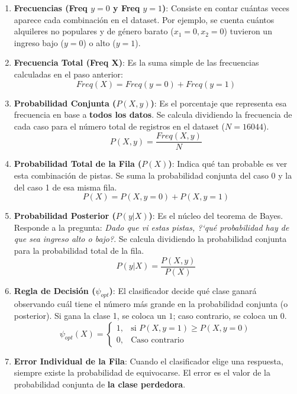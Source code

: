 \documentclass[12pt,a4paper]{article}
\begin{document}
\begin{enumerate}[label=\arabic*.]
  \item \textbf{Frecuencias (Freq $y=0$ y Freq $y=1$)}: 
  Consiste en contar cu\'antas veces aparece cada combinaci\'on en el dataset. Por ejemplo, se cuenta cu\'antos alquileres no populares y de g\'enero barato ($x_1=0, x_2=0$) tuvieron un ingreso bajo ($y=0$) o alto ($y=1$).

  \item \textbf{Frecuencia Total (Freq X)}: 
  Es la suma simple de las frecuencias calculadas en el paso anterior:
  \begin{equation} Freq(X) = Freq(y=0) + Freq(y=1) \end{equation}
  \item \textbf{Probabilidad Conjunta ($P(X, y)$)}: 
  Es el porcentaje que representa esa frecuencia en base a \textbf{todos los datos}. Se calcula dividiendo la frecuencia de cada caso para el n\'umero total de registros en el dataset ($N = 16044$).
  \begin{equation} P(X, y) = \frac{Freq(X, y)}{N} \end{equation}
  \item \textbf{Probabilidad Total de la Fila ($P(X)$)}: 
  Indica qu\'e tan probable es ver esta combinaci\'on de pistas. Se suma la probabilidad conjunta del caso 0 y la del caso 1 de esa misma fila.
  \begin{equation} P(X) = P(X, y=0) + P(X, y=1) \end{equation}
  \item \textbf{Probabilidad Posterior ($P(y|X)$)}: 
  Es el n\'ucleo del teorema de Bayes. Responde a la pregunta: \textit{Dado que vi estas pistas, ?`qu\'e probabilidad hay de que sea ingreso alto o bajo?}. Se calcula dividiendo la probabilidad conjunta para la probabilidad total de la fila.
  \begin{equation} P(y|X) = \frac{P(X, y)}{P(X)} \end{equation}
  \item \textbf{Regla de Decisi\'on ($\psi_{opt}$)}: 
  El clasificador decide qu\'e clase ganar\'a observando cu\'al tiene el n\'umero m\'as grande en la probabilidad conjunta (o posterior). Si gana la clase 1, se coloca un $1$; caso contrario, se coloca un $0$.
  \begin{equation} \psi_{opt}(X) = \begin{cases} 1, & \text{si } P(X, y=1) \geq P(X, y=0) \\ 0, & \text{Caso contrario} \end{cases} \end{equation}
  \item \textbf{Error Individual de la Fila}: 
  Cuando el clasificador elige una respuesta, siempre existe la probabilidad de equivocarse. El error es el valor de la probabilidad conjunta de \textbf{la clase perdedora}.
\end{enumerate}
\end{document}
